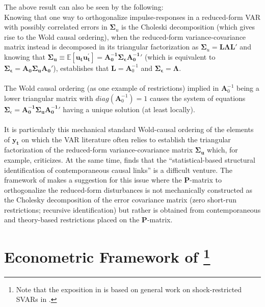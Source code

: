 \documentclass[a4paper,11pt,listof=nochaptergap,oneside,pointednumbers,bibtotoc,bigheadings,liststotoc]{scrbook}
\theoremstyle{mysatz}
\theoremstyle{mydefinition}
\theoremstyle{mytheorem}
\theoremstyle{mybemerkung}
\newcommand{\vect}[1]{\boldsymbol{\mathbf{#1}}}
\begin{document}
The above result can also be seen by the following:\\
Knowing that one way to orthogonalize impulse-responses in a reduced-form VAR with possibly correlated errors in $\vect{\Sigma}_u$ is the Choleski decomposition (which gives rise to the Wold causal ordering), when the reduced-form variance-covariance matrix instead is decomposed in its triangular factorization as $\vect{\Sigma}_u = \vect{L}\vect{\Lambda}\vect{L}'$ and knowing that $\vect{\Sigma_u}  \equiv \mathbb{E}[\vect{u_t}\vect{u_t^'}]= \vect{A_0^{-1}}\vect{\Sigma_\epsilon}\vect{A_0^{-1}}'$ (which is equivalent to $\vect{\Sigma_\epsilon} = \vect{A_0}\vect{\Sigma_u}\vect{A_0}'$), establishes that $\vect{L} = \vect{A}_0^{-1}$ and $\vect{\Sigma_\epsilon} = \vect{\Lambda}$. 
\\
\\
The Wold causal ordering (as one example of restrictions) implied in $\vect{A}_0^{-1}$ being a lower triangular matrix with $diag(\vect{A}_0^{-1}) = 1$ causes the system of equations $\vect{\Sigma}_\epsilon  = \vect{A_0^{-1}}\vect{\Sigma_u}\vect{A_0^{-1}}'$ having a unique solution (at least locally).
\\
\\
It is particularly this mechanical standard Wold-causal ordering of the elements of $\vect{y_t}$ on which the VAR literature often relies to establish the triangular factorization of the reduced-form variance-covariance matrix $\vect{\Sigma_u}$ which, for example, \citet{jorda:05} criticizes. At the same time, \citet[p. 4]{jorda:05} finds that the ``statistical-based structural identification of contemporaneous causal links'' is a difficult venture. The framework of \citet{ludvigsonetal:18} makes a suggestion for this issue where the $\vect{P}$-matrix to orthogonalize the reduced-form disturbances is not mechanically constructed as the Cholesky decomposition of the error covariance matrix (zero short-run restrictions; recursive identification) but rather is obtained from contemporaneous and theory-based restrictions placed on the $\vect{P}$-matrix.


\section[Econometric Framework of \citet{ludvigsonetal:18}]{Econometric Framework of \citet{ludvigsonetal:18}\footnote{Note that the exposition in \citet{ludvigsonetal:18} is based on general work on shock-restricted SVARs in \citet{ludvigsonetal:17}.}}
\label{sec:econometricframeworkLMN}
\end{document}
